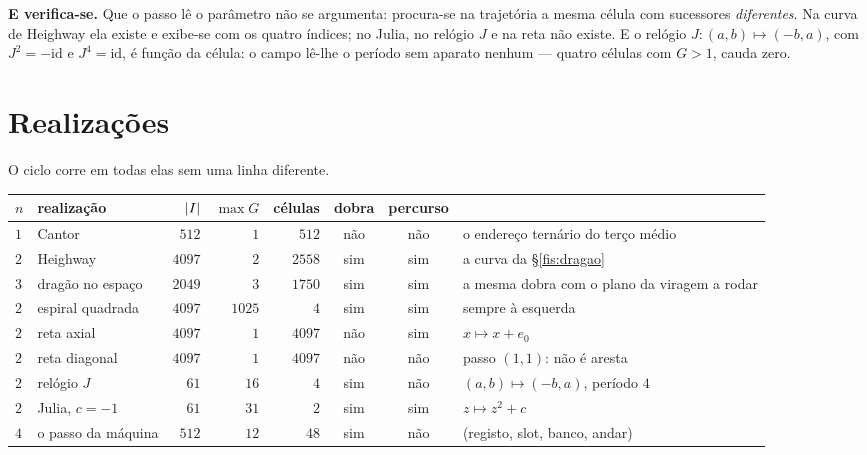 \documentclass[livro.tex]{subfiles}
\begin{document}
\medskip\noindent\textbf{E verifica-se.} Que o passo lê o parâmetro não se
argumenta: procura-se na trajetória a mesma célula com sucessores
\emph{diferentes}. Na curva de Heighway ela existe e exibe-se com os quatro
índices; no Julia, no relógio $J$ e na reta não existe. E o relógio
$J\colon(a,b)\mapsto(-b,a)$, com $J^2=-\mathrm{id}$ e $J^4=\mathrm{id}$, é função
da célula: o campo lê-lhe o período sem aparato nenhum --- quatro células com
$G>1$, cauda zero.


\section{Realizações}\label{fis:realizacoes}

\noindent O ciclo corre em todas elas sem uma linha diferente.

\begin{center}\footnotesize
\begin{tabular}{@{}llrrrccp{}@{}}
\toprule
$n$ & realização & $\lvert I\rvert$ & $\max G$ & células & dobra & percurso & \\
\midrule
$1$ & Cantor & $512$ & $1$ & $512$ & não & não & o endereço ternário do terço médio \\
$2$ & Heighway & $4097$ & $2$ & $2558$ & sim & sim & a curva da §\ref{fis:dragao} \\
$3$ & dragão no espaço & $2049$ & $3$ & $1750$ & sim & sim & a mesma dobra com o plano da viragem a rodar \\
$2$ & espiral quadrada & $4097$ & $1025$ & $4$ & sim & sim & sempre à esquerda \\
$2$ & reta axial & $4097$ & $1$ & $4097$ & não & sim & $x\mapsto x+e_0$ \\
$2$ & reta diagonal & $4097$ & $1$ & $4097$ & não & não & passo $(1,1)$: não é aresta \\
$2$ & relógio $J$ & $61$ & $16$ & $4$ & sim & não & $(a,b)\mapsto(-b,a)$, período $4$ \\
$2$ & Julia, $c=-1$ & $61$ & $31$ & $2$ & sim & sim & $z\mapsto z^{2}+c$ \\
$4$ & o passo da máquina & $512$ & $12$ & $48$ & sim & não & (registo, slot, banco, andar) \\
\bottomrule
\end{tabular}
\end{center}
\end{document}
